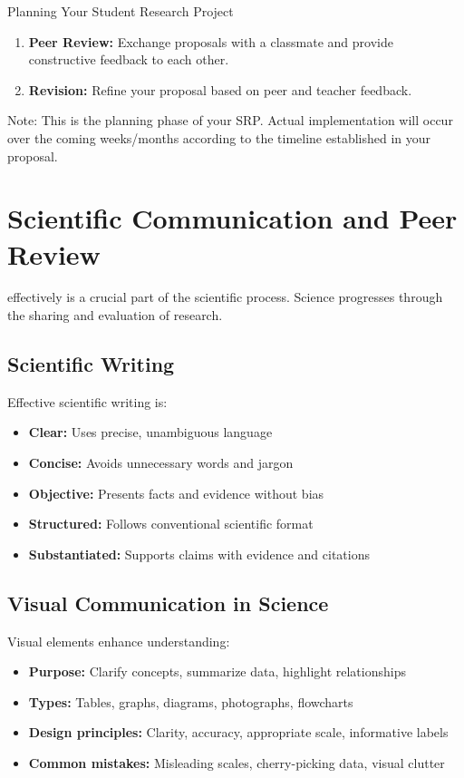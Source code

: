 \begin{investigation}{Planning Your Student Research Project}
\begin{enumerate}
    \item \textbf{Peer Review:} Exchange proposals with a classmate and provide constructive feedback to each other.
    
    \item \textbf{Revision:} Refine your proposal based on peer and teacher feedback.
\end{enumerate}

Note: This is the planning phase of your SRP. Actual implementation will occur over the coming weeks/months according to the timeline established in your proposal.
\end{investigation}

\section{Scientific Communication and Peer Review}

 effectively is a crucial part of the scientific process. Science progresses through the sharing and evaluation of research.

\subsection{Scientific Writing}

Effective scientific writing is:
\begin{itemize}
    \item \textbf{Clear:} Uses precise, unambiguous language
    \item \textbf{Concise:} Avoids unnecessary words and jargon
    \item \textbf{Objective:} Presents facts and evidence without bias
    \item \textbf{Structured:} Follows conventional scientific format
    \item \textbf{Substantiated:} Supports claims with evidence and citations
\end{itemize}

\subsection{Visual Communication in Science}

Visual elements enhance understanding:
\begin{itemize}
    \item \textbf{Purpose:} Clarify concepts, summarize data, highlight relationships
    \item \textbf{Types:} Tables, graphs, diagrams, photographs, flowcharts
    \item \textbf{Design principles:} Clarity, accuracy, appropriate scale, informative labels
    \item \textbf{Common mistakes:} Misleading scales, cherry-picking data, visual clutter
\end{itemize}

